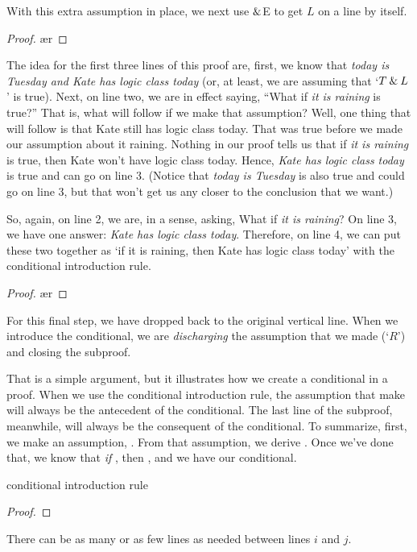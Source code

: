 With this extra assumption in place, we next use $\mathbin{\&}$E to get $L$ on a line by itself.
	\begin{proof}
		 \pr{}
		\open
			 \as{}
			\ae{r}
	\end{proof}
The idea for the first three lines of this proof are, first, we know that \textit{today is Tuesday and Kate has logic class today} (or, at least, we are assuming that `$ T \mathbin{\&} L$' is true). Next, on line two, we are in effect saying, ``What if \textit{it is raining} is true?'' That is, what will follow if we make that assumption? Well, one thing that will follow is that Kate still has logic class today. That was true before we made our assumption about it raining. Nothing in our proof tells us that if \textit{it is raining} is true, then Kate won't have logic class today. Hence, \textit{Kate has logic class today} is true and can go on line 3. (Notice that \textit{today is Tuesday} is also true and could go on line 3, but that won't get us any closer to the conclusion that we want.)

So, again, on line 2, we are, in a sense, asking, What if \textit{it is raining}? On line 3, we have one answer: \textit{Kate has logic class today}. Therefore, on line 4, we can put these two together as `if it is raining, then Kate has logic class today' with the conditional introduction rule.
	\begin{proof}
		 \pr{}
		\open
			 \as{}
			\ae{r}
			\close
	\end{proof}
For this final step, we have dropped back to the original vertical line. When we introduce the conditional, we are \emph{discharging} the assumption that we made (`$R$') and closing the subproof.

That is a simple argument, but it illustrates how we create a conditional in a proof. When we use the conditional introduction rule, the assumption that make will always be the antecedent of the conditional. The last line of the subproof, meanwhile, will always be the consequent of the conditional. 
To summarize, first, we make an assumption, . From that assumption, we derive . Once we've done that, we know that \textit{if} , then , and we have our conditional. 
\begin{factboxy}{conditional introduction rule}
	\begin{proof}
		\open
			 \as{}
		\close
	\end{proof}
\footnotesize{There can be as many or as few lines as needed between lines $i$ and $j$.} 
\end{factboxy}

